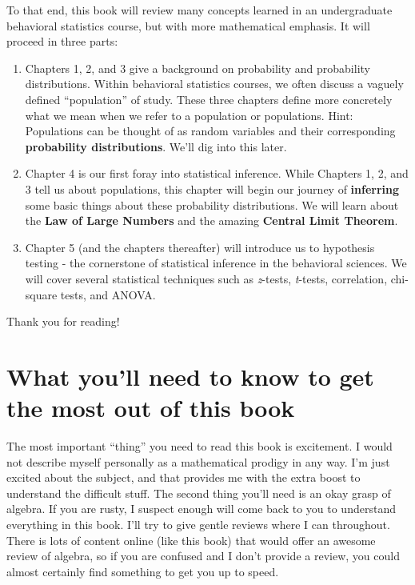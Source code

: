 \documentclass[
]{book}
\theoremstyle{definition}
\theoremstyle{definition}
\theoremstyle{definition}
\theoremstyle{definition}
\theoremstyle{remark}
\begin{document}
To that end, this book will review many concepts learned in an undergraduate behavioral statistics course, but with more mathematical emphasis. It will proceed in three parts:

\begin{enumerate}
\def\labelenumi{\arabic{enumi}.}
\item
  Chapters 1, 2, and 3 give a background on probability and probability distributions. Within behavioral statistics courses, we often discuss a vaguely defined ``population'' of study. These three chapters define more concretely what we mean when we refer to a population or populations. Hint: Populations can be thought of as random variables and their corresponding \textbf{probability distributions}. We'll dig into this later.
\item
  Chapter 4 is our first foray into statistical inference. While Chapters 1, 2, and 3 tell us about populations, this chapter will begin our journey of \textbf{inferring} some basic things about these probability distributions. We will learn about the \textbf{Law of Large Numbers} and the amazing \textbf{Central Limit Theorem}.
\item
  Chapter 5 (and the chapters thereafter) will introduce us to hypothesis testing - the cornerstone of statistical inference in the behavioral sciences. We will cover several statistical techniques such as \emph{z}-tests, \emph{t}-tests, correlation, chi-square tests, and ANOVA.
\end{enumerate}

Thank you for reading!

\section{What you'll need to know to get the most out of this book}\label{what-youll-need-to-know-to-get-the-most-out-of-this-book}

The most important ``thing'' you need to read this book is excitement. I would not describe myself personally as a mathematical prodigy in any way. I'm just excited about the subject, and that provides me with the extra boost to understand the difficult stuff. The second thing you'll need is an okay grasp of algebra. If you are rusty, I suspect enough will come back to you to understand everything in this book. I'll try to give gentle reviews where I can throughout. There is lots of content online (like this book) that would offer an awesome review of algebra, so if you are confused and I don't provide a review, you could almost certainly find something to get you up to speed.
\end{document}
